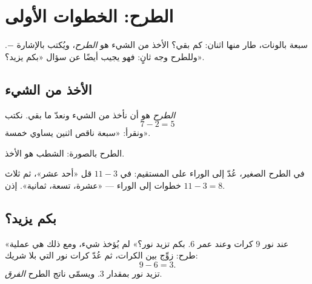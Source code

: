 \chapter{الطرح: الخطوات الأولى}\label{ch:g1:subtraction}

سبعة بالونات، طار منها اثنان: كم بقي؟ الأخذ من الشيء هو
\emph{الطرح}، ويُكتب بالإشارة $-$. وللطرح وجه ثانٍ: فهو يجيب
أيضًا عن سؤال «بكم يزيد؟».

\section{الأخذ من الشيء}

\begin{definition}[الطرح]\label{def:g1:subtraction:def}
\emph{الطرح} هو أن نأخذ من الشيء ونعدّ ما بقي. نكتب
\[
7 - 2 = 5
\]
ونقرأ: «سبعة ناقص اثنين يساوي خمسة».
\end{definition}

\begin{omfigure}

{\small الطرح بالصورة: الشطب هو الأخذ.}
\end{omfigure}

\begin{example}\label{ex:g1:subtraction:countback}
في الطرح الصغير، عُدّ إلى الوراء على المستقيم: في $11 - 3$ قل
«أحد عشر»، ثم ثلاث خطوات إلى الوراء --- «عشرة، تسعة، ثمانية». إذن
$11 - 3 = 8$.
\end{example}

\section{بكم يزيد؟}

\begin{example}[الفرق]\label{ex:g1:subtraction:difference}
«عند نور $9$ كرات وعند عمر $6$. بكم تزيد نور؟»
لم يُؤخذ شيء، ومع ذلك هي عملية طرح: زوِّج بين الكرات، ثم عُدّ كرات
نور التي بلا شريك:
\[
9 - 6 = 3 .
\]
تزيد نور بمقدار $3$. ويسمّى ناتج الطرح
\emph{الفرق}.
\end{example}

